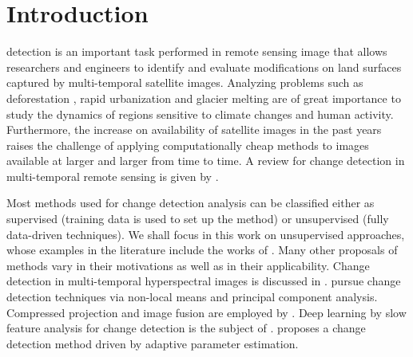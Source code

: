 \documentclass[journal]{IEEEtran}
\begin{document}
%
\IEEEpeerreviewmaketitle



\section{Introduction}
% 
% 
% 
% 

 detection is an important task performed in remote sensing image that allows researchers and engineers to identify and evaluate modifications on land surfaces captured by multi-temporal satellite images. Analyzing problems such as deforestation \cite{barreto2016deforestation}, rapid urbanization \cite{ban2012multitemporal} and glacier melting \cite{scher2021mapping} are of great importance to study the dynamics of regions sensitive to climate changes and human activity. Furthermore, the increase on availability of satellite images in the past years raises the challenge of applying computationally cheap methods to images available at larger and larger from time to time. A review for change detection in multi-temporal remote sensing is given by \cite{ban2016change}.


Most methods used for change detection analysis can be classified either as supervised (training data is used to set up the method) or unsupervised (fully data-driven techniques). We shall focus in this work on unsupervised approaches, whose examples in the literature include the works of \cite{bruzzone2000automatic,celik2010change,quin2014mimosa,saha2020change,NegriEA2021,NegriFrery2021}. Many other proposals of methods vary in their motivations as well as in their applicability.  Change detection in multi-temporal hyperspectral images is discussed in \cite{bovolo2015time,liu2019review,matsunaga2017current}.  \cite{jia2018novel} pursue change detection techniques via non-local means and principal component analysis. Compressed projection and image fusion are employed by \cite{hou2014unsupervised}. Deep learning by slow feature analysis for change detection is the subject of \cite{du2019unsupervised}. \cite{chen2020change} proposes a change detection method driven by adaptive parameter estimation.
\end{document}
